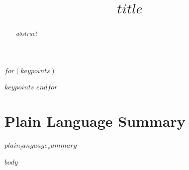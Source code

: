 \documentclass[draft]{agujournal2019}
\begin{document}
\title{$title$}




\begin{keypoints}
$for(keypoints)$
\item $keypoints$
$endfor$
\end{keypoints}

\begin{abstract}
$abstract$
\end{abstract}

\section*{Plain Language Summary}
$plain_language_summary$

$body$
\end{document}
